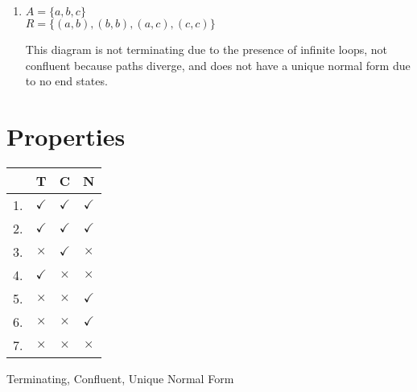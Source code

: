 \documentclass{article}
\begin{document}
\begin{enumerate}
    \item $A = \{ a, b, c \}$ \\
    \hspace*{1em} $R = \{ (a,b), (b,b), (a,c), (c,c) \}$

    \begin{center}
    \end{center}
    This diagram is not terminating due to the presence of infinite loops, not confluent because paths diverge, and does not have a unique normal form due to no end states.
\end{enumerate}

\section*{Properties}
\begin{tabular}{c c c c}
     & T & C & N \\ \hline
    1. & $\checkmark$ & $\checkmark$ & $\checkmark$ \\
    2. & $\checkmark$ & $\checkmark$ & $\checkmark$ \\
    3. & $\times$ & $\checkmark$ & $\times$ \\
    4. & $\checkmark$ & $\times$ & $\times$ \\
    5. & $\times$ & $\times$ & $\checkmark$ \\
    6. & $\times$ & $\times$ & $\checkmark$ \\
    7. & $\times$ & $\times$ & $\times$ \\
\end{tabular}

\vspace{1em}
\noindent Terminating, Confluent, Unique Normal Form
\end{document}
